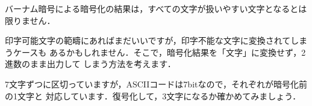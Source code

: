 \documentclass[uplatex]{jsarticle}
\begin{document}
バーナム暗号による暗号化の結果は，すべての文字が扱いやすい文字となるとは限りません．
\begin{center}
\ttfamily
{}
\end{center}
印字可能文字の範疇にあればまだいいですが，印字不能な文字に変換されてしまうケースも
あるかもしれません．そこで，暗号化結果を「文字」に変換せず，2進数のまま出力して
しまう方法を考えます．
\begin{center}
\end{center}
7文字ずつに区切っていますが，ASCIIコードは7bitなので，それぞれが暗号化前の1文字と
対応しています．復号化して，3文字になるか確かめてみましょう．
\begin{center}
\end{center}
\end{document}
